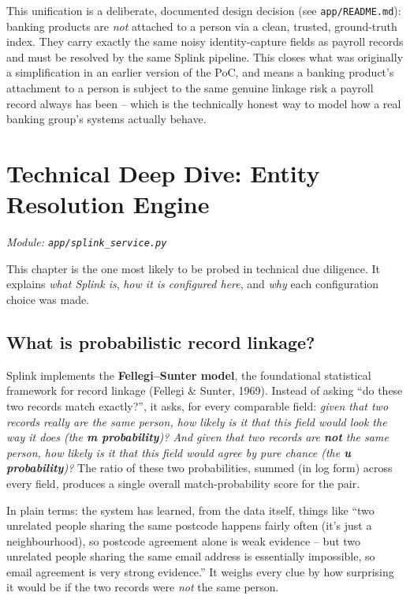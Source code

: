 \documentclass[11pt]{report}
\begin{document}
\begin{engbox}
This unification is a deliberate, documented design decision (see \texttt{app/README.md}): banking products are \emph{not} attached to a person via a clean, trusted, ground-truth index. They carry exactly the same noisy identity-capture fields as payroll records and must be resolved by the same Splink pipeline. This closes what was originally a simplification in an earlier version of the PoC, and means a banking product's attachment to a person is subject to the same genuine linkage risk a payroll record always has been -- which is the technically honest way to model how a real banking group's systems actually behave.
\end{engbox}

\chapter{Technical Deep Dive: Entity Resolution Engine}
\label{ch:splink}

\textit{Module: \texttt{app/splink\_service.py}}

This chapter is the one most likely to be probed in technical due diligence. It explains \emph{what Splink is}, \emph{how it is configured here}, and \emph{why} each configuration choice was made.

\section{What is probabilistic record linkage?}

Splink implements the \textbf{Fellegi--Sunter model}, the foundational statistical framework for record linkage (Fellegi \& Sunter, 1969). Instead of asking ``do these two records match exactly?'', it asks, for every comparable field: \emph{given that two records really are the same person, how likely is it that this field would look the way it does (the \textbf{m probability})? And given that two records are \textbf{not} the same person, how likely is it that this field would agree by pure chance (the \textbf{u probability})?} The ratio of these two probabilities, summed (in log form) across every field, produces a single overall match-probability score for the pair.

\begin{bizbox}
In plain terms: the system has learned, from the data itself, things like ``two unrelated people sharing the same postcode happens fairly often (it's just a neighbourhood), so postcode agreement alone is weak evidence -- but two unrelated people sharing the same email address is essentially impossible, so email agreement is very strong evidence.'' It weighs every clue by how surprising it would be if the two records were \emph{not} the same person.
\end{bizbox}
\end{document}
